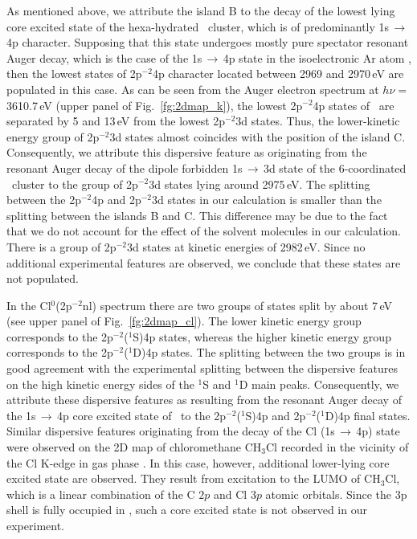 As mentioned above, we attribute the island B to the decay of the lowest lying core excited state of the hexa-hydrated \ki~cluster, which is of predominantly 1s$\,\rightarrow\,$4p character. 
Supposing that this state undergoes mostly pure spectator resonant Auger decay, which is the case of the 1s$\,\rightarrow\,$4p state in the isoelectronic Ar atom \citep{ceolin15:022502}, then the lowest states of 2p$^{-2}$4p character located between 2969 and 2970\,eV are populated in this case. As can be seen from the Auger electron spectrum at $h\nu = $3610.7\,eV (upper panel of Fig.\ \ref{fg:2dmap_k}), the lowest 2p$^{-2}$4p states of \ki~are separated by 5 and 13\,eV from the lowest 2p$^{-2}$3d states. Thus, the lower-kinetic energy group of 2p$^{-2}$3d states almost coincides with the position of the island C. Consequently, we attribute this dispersive feature as originating from the resonant Auger decay of the dipole forbidden 1s$\,\rightarrow\,$3d state of the 6-coordinated \ki~cluster to the group of 2p$^{-2}$3d states lying around 2975\,eV. The splitting between the 2p$^{-2}$4p and 2p$^{-2}$3d states in our calculation is smaller than the splitting between the islands B and C. This difference may be due to the fact that we do not account for the effect of the solvent molecules in our calculation. There is a group of 2p$^{-2}$3d states at kinetic energies of 2982\,eV. Since no additional experimental features are observed, we conclude that these states are not populated.


In the Cl$^{0}$(2p$^{-2}$nl) spectrum there are two groups of states split by about 7\,eV (see upper panel of Fig.\ \ref{fg:2dmap_cl}). The lower kinetic energy group corresponds to the 2p$^{-2}$($^1$S)4p states, whereas the higher kinetic energy group corresponds to the 2p$^{-2}$($^1$D)4p states. The splitting between the two groups is in good agreement with the experimental splitting between the dispersive features on the high kinetic energy sides of the $^1$S and $^1$D main peaks. Consequently, we attribute these dispersive features as resulting from the resonant Auger decay of the 1s$\,\rightarrow\,$4p core excited state of \cli~to the 2p$^{-2}$($^1$S)4p and  2p$^{-2}$($^1$D)4p final states. Similar dispersive features originating from the decay of the Cl (1s$\,\rightarrow\,$4p) state were observed on the 2D map of chloromethane CH$_3$Cl recorded in the vicinity of the Cl K-edge in gas phase \cite{gold16:133001}. In this case, however, additional lower-lying core excited state are observed. They result from excitation to the LUMO of CH$_3$Cl, which is a linear combination of the C $2p$ and Cl $3p$ atomic orbitals. Since the 3p shell is fully occupied in \cli, such a core excited state is not observed in our experiment.


